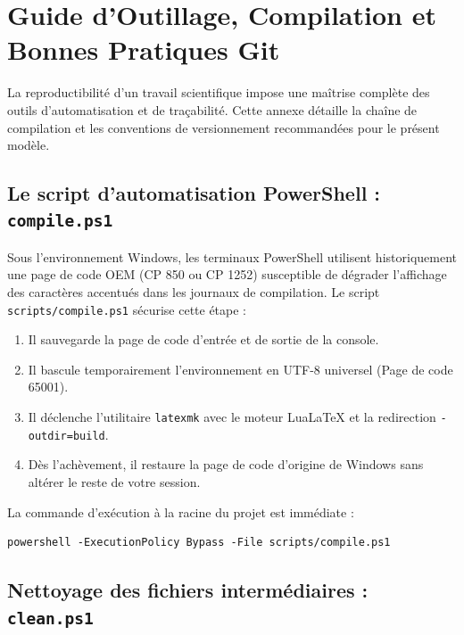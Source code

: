 \chapter{Guide d'Outillage, Compilation et Bonnes Pratiques Git}
\label{annexe:guide_outillage}

La reproductibilité d'un travail scientifique impose une maîtrise complète des outils d'automatisation et de traçabilité.
Cette annexe détaille la chaîne de compilation et les conventions de versionnement recommandées pour le présent modèle.

\section{Le script d'automatisation PowerShell : \texttt{compile.ps1}}
\label{sec:script_compile}

Sous l'environnement Windows, les terminaux PowerShell utilisent historiquement une page de code OEM (CP 850 ou CP 1252) susceptible de dégrader l'affichage des caractères accentués dans les journaux de compilation.
Le script \texttt{scripts/compile.ps1} sécurise cette étape :

\begin{enumerate}
  \item Il sauvegarde la page de code d'entrée et de sortie de la console.
  \item Il bascule temporairement l'environnement en UTF-8 universel (Page de code 65001).
  \item Il déclenche l'utilitaire \texttt{latexmk} avec le moteur Lua\LaTeX{} et la redirection \texttt{-outdir=build}.
  \item Dès l'achèvement, il restaure la page de code d'origine de Windows sans altérer le reste de votre session.
\end{enumerate}

La commande d'exécution à la racine du projet est immédiate :
\begin{verbatim}
powershell -ExecutionPolicy Bypass -File scripts/compile.ps1
\end{verbatim}

\section{Nettoyage des fichiers intermédiaires : \texttt{clean.ps1}}
\label{sec:script_clean}

